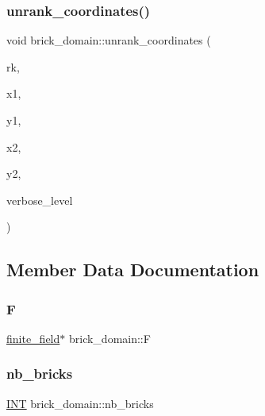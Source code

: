 \subsubsection{\texorpdfstring{unrank\+\_\+coordinates()}{unrank\_coordinates()}}
{\footnotesize\ttfamily void brick\+\_\+domain\+::unrank\+\_\+coordinates (\begin{DoxyParamCaption}\item[{\mbox{\hyperlink{galois_8h_a09fddde158a3a20bd2dcadb609de11dc}{I\+NT}}}]{rk,  }\item[{\mbox{\hyperlink{galois_8h_a09fddde158a3a20bd2dcadb609de11dc}{I\+NT}} \&}]{x1,  }\item[{\mbox{\hyperlink{galois_8h_a09fddde158a3a20bd2dcadb609de11dc}{I\+NT}} \&}]{y1,  }\item[{\mbox{\hyperlink{galois_8h_a09fddde158a3a20bd2dcadb609de11dc}{I\+NT}} \&}]{x2,  }\item[{\mbox{\hyperlink{galois_8h_a09fddde158a3a20bd2dcadb609de11dc}{I\+NT}} \&}]{y2,  }\item[{\mbox{\hyperlink{galois_8h_a09fddde158a3a20bd2dcadb609de11dc}{I\+NT}}}]{verbose\+\_\+level }\end{DoxyParamCaption})}



\subsection{Member Data Documentation}
\mbox{\label{classbrick__domain_afb4bb92545a6283dc398759f273dc889}} 
\subsubsection{\texorpdfstring{F}{F}}
{\footnotesize\ttfamily \mbox{\hyperlink{classfinite__field}{finite\+\_\+field}}$\ast$ brick\+\_\+domain\+::F}

\mbox{\label{classbrick__domain_a166b064b1ebd1270c91a2e0efe265a32}} 
\subsubsection{\texorpdfstring{nb\+\_\+bricks}{nb\_bricks}}
{\footnotesize\ttfamily \mbox{\hyperlink{galois_8h_a09fddde158a3a20bd2dcadb609de11dc}{I\+NT}} brick\+\_\+domain\+::nb\+\_\+bricks}

